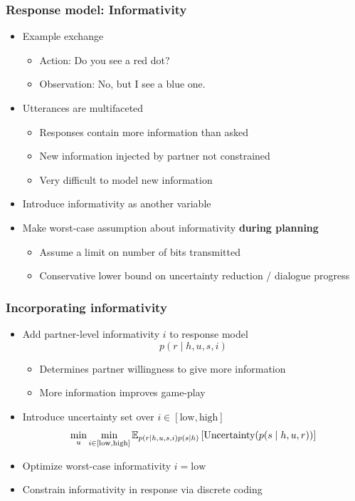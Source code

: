\documentclass{beamer}
\begin{document}
\begin{frame}
\frametitle{Response model: Informativity}
\begin{itemize}
\item Example exchange
    \begin{itemize}
    \item Action: Do you see a red dot?
    \item Observation: No, but I see a blue one.
    \end{itemize}
\item Utterances are multifaceted
    \begin{itemize}
    \item Responses contain more information than asked
    \item New information injected by partner not constrained
    \item Very difficult to model new information
    \end{itemize}
\item Introduce informativity as another variable
\item Make worst-case assumption about informativity \textbf{during planning}
    \begin{itemize}
    \item Assume a limit on number of bits transmitted
    \item Conservative lower bound on uncertainty reduction / dialogue progress
    \end{itemize}
\end{itemize}
\end{frame}

\begin{frame}
\frametitle{Incorporating informativity}
\begin{itemize}
\item Add partner-level informativity $i$ to response model
$$p(r \mid h, u, s, i)$$
    \begin{itemize}
    \item Determines partner willingness to give more information
    \item More information improves game-play
    \end{itemize}
\item Introduce uncertainty set over $i \in [\text{low}, \text{high}]$
$$\min_{u}\min_{i\in[\text{low},\text{high}]}
    \mathbb{E}_{p(r \mid h, u, s, i)p(s \mid h)}\left[\text{Uncertainty}(p(s \mid h, u, r))\right]$$
\item Optimize worst-case informativity $i = \text{low}$
\item Constrain informativity in response via discrete coding
\end{itemize}
\end{frame}
\end{document}
